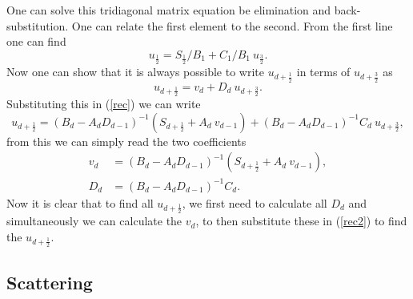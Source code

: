 \documentclass[]{article}
\begin{document}
One can solve this tridiagonal matrix equation be elimination and back-substitution. One can relate the first element to the second. From the first line one can find
\begin{equation}
u_{\frac{1}{2}} = S_{\frac{1}{2}} / B_{1} + C_{1}/B_{1} \ u_{\frac{3}{2}} .
\end{equation}
Now one can show that it is always possible to write $u_{d+\frac{1}{2}}$ in terms of $u_{d+\frac{3}{2}}$ as
\begin{equation}
u_{d+\frac{1}{2}} = v_{d} + D_{d} \ u_{d+\frac{3}{2}}  .
\end{equation}
Substituting this in (\ref{rec}) we can write
\begin{equation}
u_{d+\frac{1}{2}} = \left( B_{d} - A_{d} D_{d-1} \right)^{-1} \left( S_{d+\frac{1}{2}} + A_{d} \ v_{d-1} \right)   + \left( B_{d} - A_{d} D_{d-1} \right)^{-1} C_{d}  \ u_{d+\frac{3}{2}}  ,
\label{rec2}
\end{equation}
from this we can simply read the two coefficients
\begin{equation}
\begin{split}
v_{d} &= \left( B_{d} - A_{d} D_{d-1} \right)^{-1} \left( S_{d+\frac{1}{2}} + A_{d} \ v_{d-1} \right), \\
D_{d} &= \left( B_{d} - A_{d} D_{d-1} \right)^{-1} C_{d} .
\end{split}
\end{equation}
Now it is clear that to find all $u_{d+\frac{1}{2}}$, we first need to calculate all $D_{d}$ and simultaneously we can calculate the $v_{d}$, to then substitute these in (\ref{rec2}) to find the $u_{d+\frac{1}{2}}$.


\subsection{Scattering}
\end{document}
